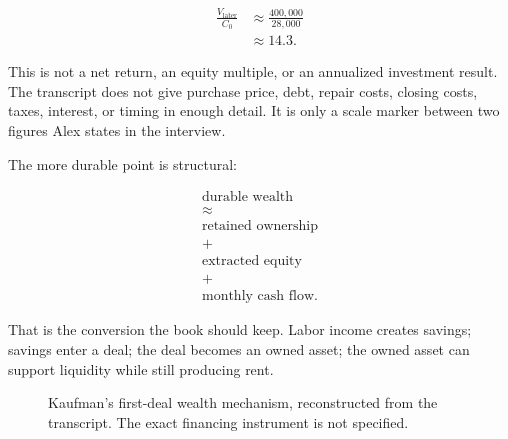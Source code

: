 \documentclass[11pt,oneside]{book}
\begin{document}
\begin{align}
\frac{V_{\text{later}}}{C_0}
&\approx
\frac{400{,}000}{28{,}000} \\
&\approx 14.3.
\end{align}

This is not a net return, an equity multiple, or an annualized investment result. The transcript does not give purchase price, debt, repair costs, closing costs, taxes, interest, or timing in enough detail. It is only a scale marker between two figures Alex states in the interview.

The more durable point is structural:

\begin{equation}
\begin{gathered}
\text{durable wealth}\\
\approx\\
\text{retained ownership}\\
+\\
\text{extracted equity}\\
+\\
\text{monthly cash flow}.
\end{gathered}
\end{equation}

That is the conversion the book should keep. Labor income creates savings; savings enter a deal; the deal becomes an owned asset; the owned asset can support liquidity while still producing rent.

\begin{figure}
\centering
{}
\caption{Kaufman's first-deal wealth mechanism, reconstructed from the transcript. The exact financing instrument is not specified.}
\end{figure}
\end{document}
